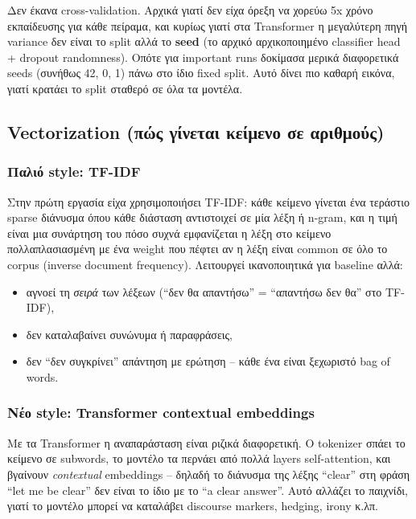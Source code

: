 \documentclass[12pt]{fphw}
\begin{document}
Δεν έκανα cross-validation. Αρχικά γιατί δεν είχα όρεξη να χορεύω 5x χρόνο εκπαίδευσης για κάθε πείραμα, και κυρίως γιατί στα Transformer η μεγαλύτερη πηγή variance δεν είναι το split αλλά το \textbf{seed} (το αρχικό αρχικοποιημένο classifier head + dropout randomness). Οπότε για important runs δοκίμασα μερικά διαφορετικά seeds (συνήθως 42, 0, 1) πάνω στο ίδιο fixed split. Αυτό δίνει πιο καθαρή εικόνα, γιατί κρατάει το split σταθερό σε όλα τα μοντέλα.

\subsection{Vectorization (πώς γίνεται κείμενο σε αριθμούς)}

\subsubsection{Παλιό style: TF-IDF}

Στην πρώτη εργασία είχα χρησιμοποιήσει TF-IDF: κάθε κείμενο γίνεται ένα τεράστιο sparse διάνυσμα όπου κάθε διάσταση αντιστοιχεί σε μία λέξη ή n-gram, και η τιμή είναι μια συνάρτηση του πόσο συχνά εμφανίζεται η λέξη στο κείμενο πολλαπλασιασμένη με ένα weight που πέφτει αν η λέξη είναι common σε όλο το corpus (inverse document frequency). Λειτουργεί ικανοποιητικά για baseline αλλά:
\begin{itemize}
    \item αγνοεί τη \emph{σειρά} των λέξεων (``δεν θα απαντήσω'' = ``απαντήσω δεν θα'' στο TF-IDF),
    \item δεν καταλαβαίνει συνώνυμα ή παραφράσεις,
    \item δεν ``δεν συγκρίνει'' απάντηση με ερώτηση -- κάθε ένα είναι ξεχωριστό bag of words.
\end{itemize}

\subsubsection{Νέο style: Transformer contextual embeddings}

Με τα Transformer η αναπαράσταση είναι ριζικά διαφορετική. Ο tokenizer σπάει το κείμενο σε subwords, το μοντέλο τα περνάει από πολλά layers self-attention, και βγαίνουν \emph{contextual} embeddings -- δηλαδή το διάνυσμα της λέξης ``clear'' στη φράση ``let me be clear'' δεν είναι το ίδιο με το ``a clear answer''. Αυτό αλλάζει το παιχνίδι, γιατί το μοντέλο μπορεί να καταλάβει discourse markers, hedging, irony κ.λπ.
\end{document}
